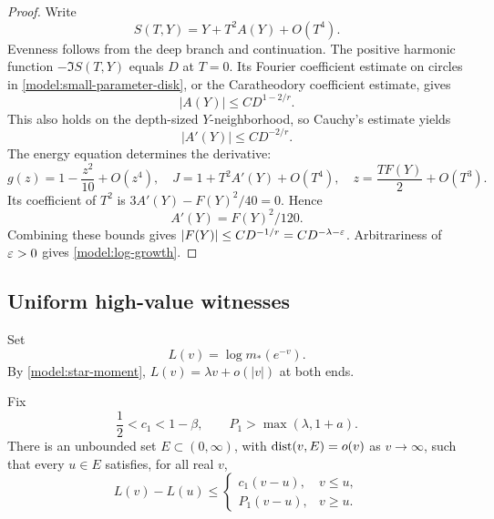 \begin{proof}
Write
\[
 S(T,Y)=Y+T^2A(Y)+O(T^4).
\]
Evenness follows from the deep branch and continuation.
The positive harmonic function \(-\Im S(T,Y)\) equals
\(D\) at \(T=0\).  Its Fourier coefficient estimate on
circles in \eqref{model:small-parameter-disk}, or the
Caratheodory coefficient estimate, gives
\[
 |A(Y)|\le C D^{1-2/r}.
\]
This also holds on the depth-sized \(Y\)-neighborhood,
so Cauchy's estimate yields
\begin{equation}
\label{model:A-derivative-bound}
 |A'(Y)|\le C D^{-2/r}.
\end{equation}
The energy equation determines the derivative:
\[
 g(z)=1-\frac{z^2}{10}+O(z^4),\quad
 J=1+T^2A'(Y)+O(T^4),\quad
 z=\frac{TF(Y)}2+O(T^3).
\]
Its coefficient of \(T^2\) is
\(3A'(Y)-F(Y)^2/40=0\).  Hence
\begin{equation}
\label{model:A-coefficient}
 A'(Y)=F(Y)^2/120.
\end{equation}
Combining these bounds gives
\(|F(Y)|\le C D^{-1/r}=C D^{-\lambda-\varepsilon}\).
Arbitrariness of \(\varepsilon>0\) gives
\eqref{model:log-growth}.
\end{proof}

\subsection{Uniform high-value witnesses}
\label{model:witness-subsection}

Set
\begin{equation}
\label{model:L-definition}
 L(v)=\log m_*(e^{-v}).
\end{equation}
By \eqref{model:star-moment},
\(L(v)=\lambda v+o(|v|)\) at both ends.

\begin{lemma}
\label{model:normal-epochs}
Fix
\[
 \frac12<c_1<1-\beta,\qquad
 P_1>\max(\lambda,1+a).
\]
There is an unbounded set \(E\subset(0,\infty)\), with
\(\operatorname{dist}(v,E)=o(v)\) as \(v\to\infty\), such that every
\(u\in E\) satisfies, for all real \(v\),
\begin{equation}
\label{model:epoch-envelope}
 L(v)-L(u)\le
 \begin{cases}
  c_1(v-u),&v\le u,\\
  P_1(v-u),&v\ge u.
 \end{cases}
\end{equation}
\end{lemma}

